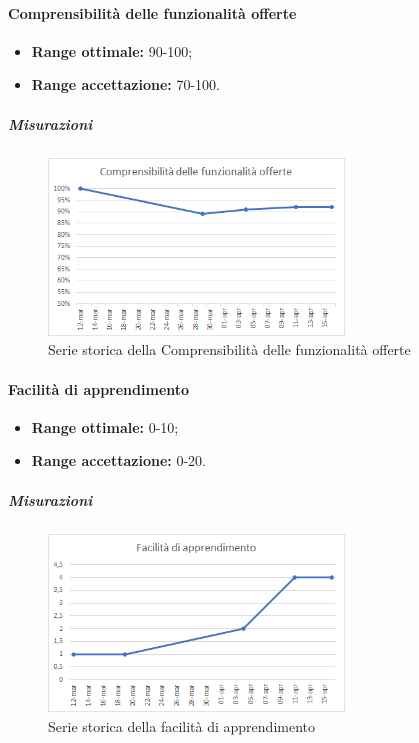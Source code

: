 			\paragraph{Comprensibilità delle funzionalità offerte} \Spazio 
			\begin{itemize}
				\item {\textbf{Range ottimale:} 90-100;}
				\item {\textbf{Range accettazione:} 70-100.}
			\end{itemize} 
		   \subparagraph{Misurazioni}
		    \begin{figure}[H]
		   	\centering 
		    	\includegraphics[width=0.7\textwidth]{images/compr.png}
		    	\caption{Serie storica della Comprensibilità delle funzionalità offerte}
		    	\label{compr} 
		    \end{figure}
			\paragraph{Facilità di apprendimento} \Spazio 
			\begin{itemize}
				\item {\textbf{Range ottimale:} 0-10;}
				\item {\textbf{Range accettazione:} 0-20.}
			\end{itemize} 
			 \subparagraph{Misurazioni}
			\begin{figure}[H]
				\centering 
				\includegraphics[width=0.7\textwidth]{images/fac.png}
				\caption{Serie storica della facilità di apprendimento}
				\label{fac} 
			\end{figure}
